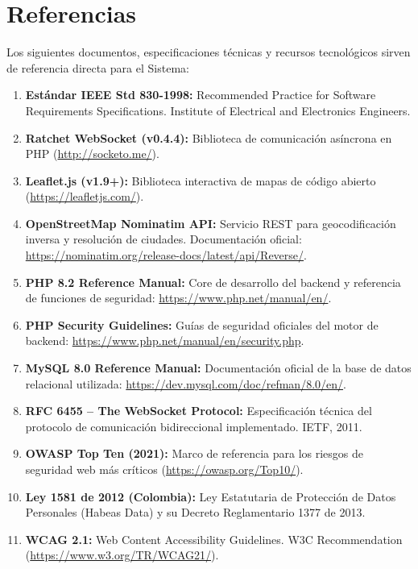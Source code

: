 \documentclass[11pt,a4paper]{report}
\begin{document}
\section{Referencias}
Los siguientes documentos, especificaciones técnicas y recursos tecnológicos sirven de referencia directa para el Sistema:
\begin{enumerate}
    \item \textbf{Estándar IEEE Std 830-1998:} Recommended Practice for Software Requirements Specifications. Institute of Electrical and Electronics Engineers.
    \item \textbf{Ratchet WebSocket (v0.4.4):} Biblioteca de comunicación asíncrona en PHP (\url{http://socketo.me/}).
    \item \textbf{Leaflet.js (v1.9+):} Biblioteca interactiva de mapas de código abierto (\url{https://leafletjs.com/}).
    \item \textbf{OpenStreetMap Nominatim API:} Servicio REST para geocodificación inversa y resolución de ciudades. Documentación oficial: \url{https://nominatim.org/release-docs/latest/api/Reverse/}.
    \item \textbf{PHP 8.2 Reference Manual:} Core de desarrollo del backend y referencia de funciones de seguridad: \url{https://www.php.net/manual/en/}.
    \item \textbf{PHP Security Guidelines:} Guías de seguridad oficiales del motor de backend: \url{https://www.php.net/manual/en/security.php}.
    \item \textbf{MySQL 8.0 Reference Manual:} Documentación oficial de la base de datos relacional utilizada: \url{https://dev.mysql.com/doc/refman/8.0/en/}.
    \item \textbf{RFC 6455 -- The WebSocket Protocol:} Especificación técnica del protocolo de comunicación bidireccional implementado. IETF, 2011.
    \item \textbf{OWASP Top Ten (2021):} Marco de referencia para los riesgos de seguridad web más críticos (\url{https://owasp.org/Top10/}).
    \item \textbf{Ley 1581 de 2012 (Colombia):} Ley Estatutaria de Protección de Datos Personales (Habeas Data) y su Decreto Reglamentario 1377 de 2013.
    \item \textbf{WCAG 2.1:} Web Content Accessibility Guidelines. W3C Recommendation (\url{https://www.w3.org/TR/WCAG21/}).
\end{enumerate}
\end{document}
